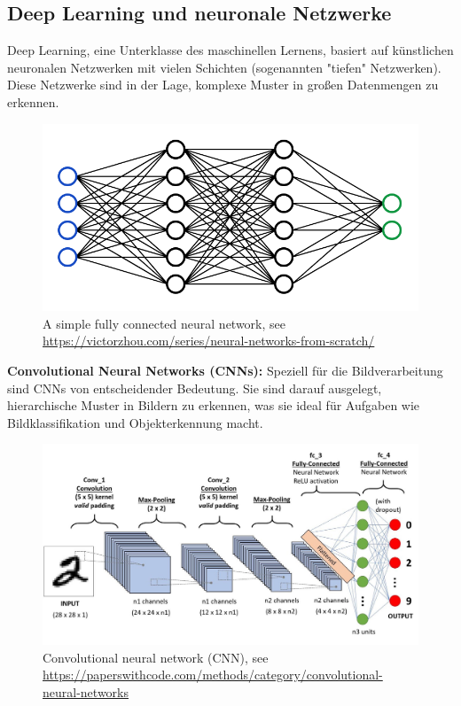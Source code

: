 \documentclass[nolibertine, ngerman, algorithm, nomencl, minted]{ttlab-qualify}
\begin{document}
\subsection{Deep Learning und neuronale Netzwerke}

Deep Learning, eine Unterklasse des maschinellen Lernens, basiert auf künstlichen neuronalen Netzwerken mit vielen Schichten (sogenannten "tiefen" Netzwerken). Diese Netzwerke sind in der Lage, komplexe Muster in großen Datenmengen zu erkennen.

\begin{figure}[h]
	\centering
	\includegraphics[scale=0.4]{static/FCnetwork.png}
	\caption{A simple fully connected neural network, see \url{https://victorzhou.com/series/neural-networks-from-scratch/}}
	\label{fig:2.1}
\end{figure}

\textbf{Convolutional Neural Networks (CNNs):} Speziell für die Bildverarbeitung sind CNNs von entscheidender Bedeutung. Sie sind darauf ausgelegt, hierarchische Muster in Bildern zu erkennen, was sie ideal für Aufgaben wie Bildklassifikation und Objekterkennung macht.
\begin{figure}[h]
	\centering
	\includegraphics[scale=0.2]{static/cnn.jpeg}
	\caption{Convolutional neural network (CNN), see \url{https://paperswithcode.com/methods/category/convolutional-neural-networks}}
	\label{fig:2.2}
\end{figure}
\end{document}
